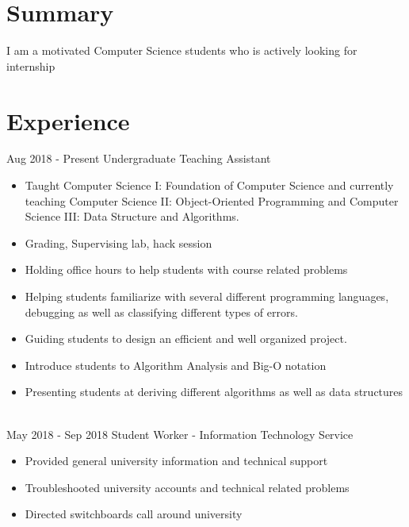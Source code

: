 \documentclass[letterpaper]{twentysecondcv} %
\begin{document}
\makeprofile %
 \section{Summary}
    I am a motivated Computer Science students who is actively looking for internship

\section{Experience}

\begin{twenty} %
\twentyitem
    	{Aug 2018 -}
		{Present}
        {Undergraduate Teaching Assistant}
        {}
        {}
        {\begin{itemize}
        \item Taught Computer Science I: Foundation of Computer Science and currently teaching Computer Science II: Object-Oriented Programming and Computer Science III: Data Structure and Algorithms.
        \item Grading, Supervising lab, hack session
        \item Holding office hours to help students with course related problems
        \item Helping students familiarize with several different programming languages, debugging as well as classifying different types of errors.
        \item Guiding students to design an efficient and well organized project.
        \item Introduce students to Algorithm Analysis and Big-O notation
        \item Presenting students at deriving different algorithms as well as data structures 
        \end{itemize}}
        \\
	\twentyitem
    	{May 2018 -}
		{Sep 2018}
        {Student Worker - Information Technology Service}
        {}
        {}
        {
        {\begin{itemize}
        \item Provided general university information and technical support
        \item Troubleshooted university accounts and technical related problems
        \item Directed switchboards call around university
    \end{itemize}}
        }
    
        
\end{twenty}
\end{document}
